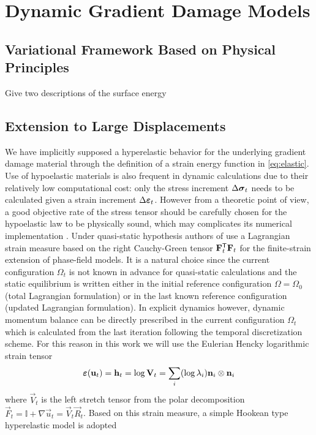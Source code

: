 \chapter{Dynamic Gradient Damage Models}
\minitoc

\section{Variational Framework Based on Physical Principles} \label{sec:formulation}
Give two descriptions of the surface energy

\section{Extension to Large Displacements}
We have implicitly supposed a hyperelastic behavior for the underlying gradient damage material through the definition of a strain energy function in \eqref{eq:elastic}. Use of hypoelastic materials is also frequent in dynamic calculations due to their relatively low computational cost: only the stress increment $\Delta\sig_t$ needs to be calculated given a strain increment $\Delta\eps_t$. However from a theoretic point of view, a good objective rate of the stress tensor should be carefully chosen for the hypoelastic law to be physically sound, which may complicates its numerical implementation \cite{SimoPister:1984}. Under quasi-static hypothesis authors of \cite{PieroLancioniMarch:2007,MieheSchaenzelUlmer:2015} use a Lagrangian strain measure based on the right Cauchy-Green tensor $\vec{F}_t^\mT\vec{F}_t$ for the finite-strain extension of phase-field models. It is a natural choice since the current configuration $\Omega_t$ is not known in advance for quasi-static calculations and the static equilibrium is written either in the initial reference configuration $\Omega=\Omega_0$ (total Lagrangian formulation) or in the last known reference configuration (updated Lagrangian formulation). In explicit dynamics however, dynamic momentum balance can be directly prescribed in the current configuration $\Omega_t$ which is calculated from the last iteration following the temporal discretization scheme. For this reason in this work we will use the Eulerian Hencky logarithmic strain tensor \cite{XiaoBruhnsMeyers:1997}
\begin{equation} \label{eq:logstrain}
\eps(\vec{u}_t)=\vec{h}_t=\log\vec{V}_t=\sum_i(\log\lambda_i)\vec{n}_i\otimes\vec{n}_i
\end{equation}
where $\vec{V}_t$ is the left stretch tensor from the polar decomposition $\vec{F}_t=\mathbb{I}+\nabla\vec{u}_t=\vec{V}_t\vec{R}_t$. Based on this strain measure, a simple Hookean type hyperelastic model \cite{XiaoChen:2002} is adopted
